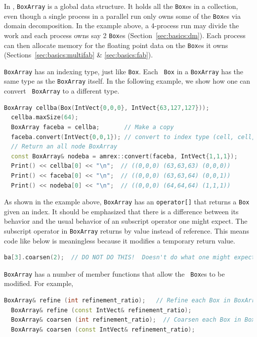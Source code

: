 {In \amrex, {\tt BoxArray} is a global data structure.  It holds all
the {\tt Box}es in a collection, even though a single process in a
parallel run only owns some of the {\tt Box}es via domain
decomposition.  In the example above, a 4-process run may divide the
work and each process owns say 2 {\tt Box}es
(Section~\ref{sec:basics:dm}).  Each process can then allocate memory
for the floating point data on the {\tt Box}es it owns
(Sections~\ref{sec:basics:multifab} \& \ref{sec:basics:fab}). 

{\tt BoxArray} has an indexing type, just like {\tt Box}.  Each {\tt
  Box} in a {\tt BoxArray} has the same type as the {\tt BoxArray}
itself.  In the following example, we show how one can convert {\tt
  BoxArray} to a different type. 
\begin{lstlisting}[language=cpp]
  BoxArray cellba(Box(IntVect{0,0,0}, IntVect{63,127,127}));
  cellba.maxSize(64);
  BoxArray faceba = cellba;       // Make a copy
  faceba.convert(IntVect{0,0,1}); // convert to index type (cell, cell, node)
  // Return an all node BoxArray
  const BoxArray& nodeba = amrex::convert(faceba, IntVect{1,1,1});
  Print() << cellba[0] << "\n";  // ((0,0,0) (63,63,63) (0,0,0))
  Print() << faceba[0] << "\n";  // ((0,0,0) (63,63,64) (0,0,1))  
  Print() << nodeba[0] << "\n";  // ((0,0,0) (64,64,64) (1,1,1))
\end{lstlisting}

As shown in the example above, {\tt BoxArray} has an {\tt operator[]}
that returns a {\tt Box} given an index.  It should be emphasized that
there is a difference between its behavior and the usual behavior of
an subscript operator one might expect.  The subscript operator in
{\tt BoxArray} returns by value instead of reference.  This means code
like below is meaningless because it modifies a temporary return
value. 
\begin{lstlisting}[language=cpp]
  ba[3].coarsen(2);  // DO NOT DO THIS!  Doesn't do what one might expect.
\end{lstlisting}

{\tt BoxArray} has a number of member functions that allow the {\tt
  Box}es to be modified.  For example,
\begin{lstlisting}[language=cpp]
  BoxArray& refine (int refinement_ratio);   // Refine each Box in BoxArray
  BoxArray& refine (const IntVect& refinement_ratio);
  BoxArray& coarsen (int refinement_ratio);  // Coarsen each Box in BoxArray
  BoxArray& coarsen (const IntVect& refinement_ratio);
\end{lstlisting}

}
